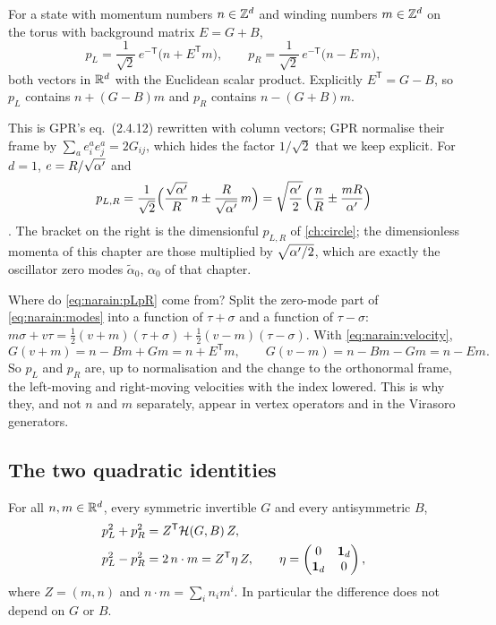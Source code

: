 \begin{definition}\label{def:narain:pLpR}
For a state with momentum numbers $n\in\mathbb{Z}^d$ and winding numbers $m\in\mathbb{Z}^d$ on the torus with
background matrix $E=G+B$,
\begin{equation}\label{eq:narain:pLpR}
 p_L=\frac1{\sqrt2}\,e^{-\mathsf T}\big(n+E^{\mathsf T}m\big),\qquad
 p_R=\frac1{\sqrt2}\,e^{-\mathsf T}\big(n-E\,m\big),
\end{equation}
both vectors in $\mathbb{R}^d$ with the Euclidean scalar product. Explicitly
$E^{\mathsf T}=G-B$, so $p_L$ contains $n+(G-B)m$ and $p_R$ contains $n-(G+B)m$.
\end{definition}

This is GPR's eq.~(2.4.12)  rewritten with column vectors;
GPR normalise their frame by $\sum_ae^a_ie^a_j=2G_{ij}$, which hides the factor
$1/\sqrt2$ that we keep explicit. For $d=1$, $e=R/\sqrt{\alpha'}$ and
\begin{equation}\label{eq:narain:pLpRcircle}
 p_{L,R}=\frac1{\sqrt2}\Big(\frac{\sqrt{\alpha'}}R\,n\pm\frac R{\sqrt{\alpha'}}\,m\Big)
 =\sqrt{\frac{\alpha'}2}\,\Big(\frac nR\pm\frac{mR}{\alpha'}\Big)
\end{equation}
. The bracket on the right is the dimensionful
$p_{L,R}$ of \cref{ch:circle}; the dimensionless momenta of this chapter are those multiplied
by $\sqrt{\alpha'/2}$, which are exactly the oscillator zero modes $\tilde\alpha_0$, $\alpha_0$
of that chapter.

Where do \eqref{eq:narain:pLpR} come from? Split the zero-mode part of \eqref{eq:narain:modes}
into a function of $\tau+\sigma$ and a function of $\tau-\sigma$:
$m\sigma+v\tau=\frac12(v+m)(\tau+\sigma)+\frac12(v-m)(\tau-\sigma)$. With
\eqref{eq:narain:velocity},
\[
 G(v+m)=n-Bm+Gm=n+E^{\mathsf T}m,\qquad G(v-m)=n-Bm-Gm=n-Em .
\]
So $p_L$ and $p_R$ are, up to normalisation and the change to the orthonormal frame, the
left-moving and right-moving velocities with the index lowered. This is why they, and not $n$
and $m$ separately, appear in vertex operators and in the Virasoro generators.

\subsection{The two quadratic identities}

\begin{proposition}\label{thm:narain:identities}
For all $n,m\in\mathbb{R}^d$, every symmetric invertible $G$ and every antisymmetric $B$,
\begin{align}
 p_L^2+p_R^2&=Z^{\mathsf T}\mathcal{H}(G,B)\,Z ,\label{eq:narain:sum}\\
 p_L^2-p_R^2&=2\,n\cdot m=Z^{\mathsf T}\eta\,Z ,
 \qquad \eta=\begin{pmatrix}0&\mathbf 1_d\\\mathbf 1_d&0\end{pmatrix},\label{eq:narain:diff}
\end{align}
where $Z=(m,n)$ and $n\cdot m=\sum_in_im^i$. In particular the difference does not depend on
$G$ or $B$.
\end{proposition}

